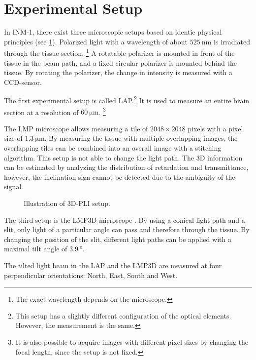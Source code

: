 \section{Experimental Setup}\label{sec:expSetup}
%
In \ac{INM-1}, there exist three microscopic setups based on identic physical principles \cite{Axer2011} (see \cref{fig:pli_setup}).
Polarized light with a wavelength of about $\SI{525}{\nano\meter}$ is irradiated through the tissue section. \footnote{The exact wavelength depends on the microscope.}
A rotatable polarizer is mounted in front of the tissue in the beam path, and a fixed circular polarizer is mounted behind the tissue.
By rotating the polarizer, the change in intensity is measured with a \ac{CCD}-sensor.
\par
% 
The first experimental setup is called \ac{LAP}.\footnote{This setup has a slightly different configuration of the optical elements. However, the measurement is the same.}
It is used to measure an entire brain section at a resolution of $\SI{60}{\micro\meter}$. \footnote{It is also possible to acquire images with different pixel sizes \eg{} by changing the focal length, since the setup is not fixed.}
\par
% 
The \ac{LMP} microscope allows measuring a tile of $\num{2048}\times\num{2048}$ pixels with a pixel size of $\SI{1.3}{\micro\meter}$.
By measuring the tissue with multiple overlapping images, the overlapping tiles can be combined into an overall image with a stitching algorithm. 
This setup is not able to change the light path.
The 3D information can be estimated by analyzing the distribution of retardation and transmittance, however, the inclination sign cannot be detected due to the ambiguity of the signal.
\par
% 
\begin{figure}[!t]
    \captionsetup[sub]{position=top}
    \setlength{\tikzwidth}{\textwidth}
	\centering
	\caption[]{Illustration of \acs{3D-PLI} setup.}
	\label{fig:pli_setup}
\end{figure}
% 
The third setup is the \ac{LMP3D} microscope \cite{Wiese:887678}.
By using a conical light path and a slit, only light of a particular angle can pass and therefore through the tissue.
By changing the position of the slit, different light paths can be applied with a maximal tilt angle of $\SI{3.9}{\degree}$.
\par
% 
The tilted light beam in the \acs{LAP} and the \acs{LMP3D} are measured at four perpendicular orientations: North, East, South and West.
